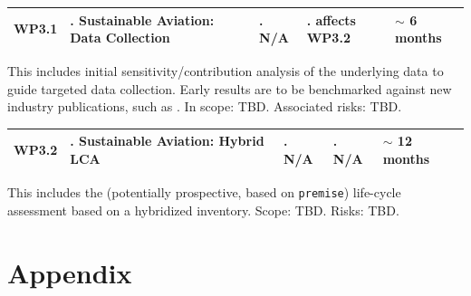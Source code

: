 \documentclass{article}
\begin{document}
    \begin{table}[H]
        \centering
        \begin{tabularx}{\linewidth}{
            |>{\hsize=0.25\hsize}X
            |>{\hsize=1.\hsize}X
            |>{\hsize=1.\hsize}X
            |>{\hsize=1.\hsize}X
            |>{\hsize=0.75\hsize}X|
          } %
            \hline
                WP3.1
            &
                Sustainable Aviation: \newline Data Collection
            &
                N/A
            &
                affects WP3.2
            &
                $\sim$ 6 months
            \\
            \hline
        \end{tabularx}
    \end{table}
    \vspace*{-9pt}
    
    This includes initial sensitivity/contribution analysis of the underlying data to guide targeted data collection. Early results are to be benchmarked against new industry publications, such as \cite{noauthor_challenger_2022}. In scope: TBD. Associated risks: TBD.
    
    \begin{table}[H]
        \centering
        \begin{tabularx}{\linewidth}{
            |>{\hsize=0.25\hsize}X
            |>{\hsize=1.\hsize}X
            |>{\hsize=1.\hsize}X
            |>{\hsize=1.\hsize}X
            |>{\hsize=0.75\hsize}X|
          } %
            \hline
                WP3.2
            &
                Sustainable Aviation: \newline Hybrid LCA
            &
                N/A
            &
                N/A
            &
                $\sim$ 12 months
            \\
            \hline
        \end{tabularx}
    \end{table}
    
    This includes the (potentially prospective, based on \texttt{premise}) life-cycle assessment based on a hybridized inventory. Scope: TBD. Risks: TBD.

\newpage
\section{Appendix}

\end{document}
